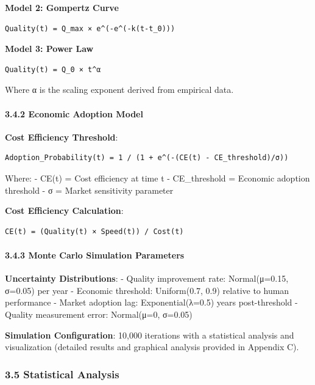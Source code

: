 \documentclass[12pt,a4paper]{article}
\begin{document}
{{\textbf{Model 2: Gompertz Curve}

\begin{verbatim}
Quality(t) = Q_max × e^(-e^(-k(t-t_0)))
\end{verbatim}

\textbf{Model 3: Power Law}

\begin{verbatim}
Quality(t) = Q_0 × t^α
\end{verbatim}

Where α is the scaling exponent derived from empirical data.

\hypertarget{economic-adoption-model}{%
\paragraph{3.4.2 Economic Adoption
Model}\label{economic-adoption-model}}

\textbf{Cost Efficiency Threshold}:

\begin{verbatim}
Adoption_Probability(t) = 1 / (1 + e^(-(CE(t) - CE_threshold)/σ))
\end{verbatim}

Where: - CE(t) = Cost efficiency at time t - CE\_threshold = Economic
adoption threshold - σ = Market sensitivity parameter

\textbf{Cost Efficiency Calculation}:

\begin{verbatim}
CE(t) = (Quality(t) × Speed(t)) / Cost(t)
\end{verbatim}

\hypertarget{monte-carlo-simulation-parameters}{%
\paragraph{3.4.3 Monte Carlo Simulation
Parameters}\label{monte-carlo-simulation-parameters}}

\textbf{Uncertainty Distributions}: - Quality improvement rate:
Normal(μ=0.15, σ=0.05) per year - Economic threshold: Uniform(0.7, 0.9)
relative to human performance - Market adoption lag: Exponential(λ=0.5)
years post-threshold - Quality measurement error: Normal(μ=0, σ=0.05)

\textbf{Simulation Configuration}: 10,000 iterations with a statistical analysis and visualization (detailed results and graphical analysis provided in Appendix C).

\hypertarget{statistical-analysis}{%
\subsubsection{3.5 Statistical Analysis}\label{statistical-analysis}}

}}
\end{document}
